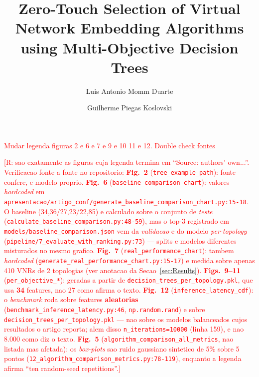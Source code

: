 \documentclass[runningheads]{llncs}
\begin{document}
\title{Zero-Touch Selection of Virtual Network Embedding Algorithms using
Multi-Objective Decision Trees}

\textcolor{red}{Mudar legenda figuras 2 e 6 e 7 e 9 e 10  11 e 12. Double check fontes}

\textcolor{red}{[R: sao exatamente as figuras cuja legenda termina em ``Source: authors' own...''. Verificacao fonte a fonte no repositorio:
\textbf{Fig.~2} (\texttt{tree\_example\_path}): fonte confere, e modelo proprio.
\textbf{Fig.~6} (\texttt{baseline\_comparison\_chart}): valores \emph{hardcoded} em \texttt{apresentacao/artigo\_conf/generate\_baseline\_comparison\_chart.py:15-18}. O baseline (34,36/27,23/22,85) e calculado sobre o conjunto de \emph{teste} (\texttt{calculate\_baseline\_comparison.py:48-59}), mas o top-3 registrado em \texttt{models/baseline\_comparison.json} vem da \emph{validacao} e do modelo \emph{per-topology} (\texttt{pipeline/7\_evaluate\_with\_ranking.py:73}) --- splits e modelos diferentes misturados no mesmo grafico.
\textbf{Fig.~7} (\texttt{real\_performance\_chart}): tambem \emph{hardcoded} (\texttt{generate\_real\_performance\_chart.py:15-17}) e medida sobre apenas 410 VNRs de 2 topologias (ver anotacao da Secao~\ref{sec:Results}).
\textbf{Figs.~9--11} (\texttt{per\_objective\_*}): geradas a partir de \texttt{decision\_trees\_per\_topology.pkl}, que usa \textbf{34} features, nao 27 como afirma o texto.
\textbf{Fig.~12} (\texttt{inference\_latency\_cdf}): o \emph{benchmark} roda sobre features \textbf{aleatorias} (\texttt{benchmark\_inference\_latency.py:46}, \texttt{np.random.rand}) e sobre \texttt{decision\_trees\_per\_topology.pkl} --- nao sobre os modelos balanceados cujos resultados o artigo reporta; alem disso \texttt{n\_iterations=10000} (linha 159), e nao 8.000 como diz o texto.
\textbf{Fig.~5} (\texttt{algorithm\_comparison\_all\_metrics}, nao listada mas afetada): os \emph{box-plots} sao ruido gaussiano sintetico de 5\% sobre 5 pontos (\texttt{12\_algorithm\_comparison\_metrics.py:78-119}), enquanto a legenda afirma ``ten random-seed repetitions''.]}


\author{Luis Antonio Momm Duarte \and
Guilherme Piegas Koslovski}


\end{document}
